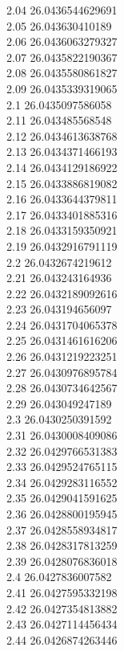 {2.04	26.0436544629691\\
2.05	26.043630410189\\
2.06	26.0436063279327\\
2.07	26.0435822190367\\
2.08	26.0435580861827\\
2.09	26.0435339319065\\
2.1	26.0435097586058\\
2.11	26.043485568548\\
2.12	26.0434613638768\\
2.13	26.0434371466193\\
2.14	26.0434129186922\\
2.15	26.0433886819082\\
2.16	26.0433644379811\\
2.17	26.0433401885316\\
2.18	26.0433159350921\\
2.19	26.0432916791119\\
2.2	26.0432674219612\\
2.21	26.043243164936\\
2.22	26.0432189092616\\
2.23	26.043194656097\\
2.24	26.0431704065378\\
2.25	26.0431461616206\\
2.26	26.0431219223251\\
2.27	26.0430976895784\\
2.28	26.0430734642567\\
2.29	26.043049247189\\
2.3	26.0430250391592\\
2.31	26.0430008409086\\
2.32	26.0429766531383\\
2.33	26.0429524765115\\
2.34	26.0429283116552\\
2.35	26.0429041591625\\
2.36	26.0428800195945\\
2.37	26.0428558934817\\
2.38	26.0428317813259\\
2.39	26.0428076836018\\
2.4	26.0427836007582\\
2.41	26.0427595332198\\
2.42	26.0427354813882\\
2.43	26.0427114456434\\
2.44	26.0426874263446\\
}

